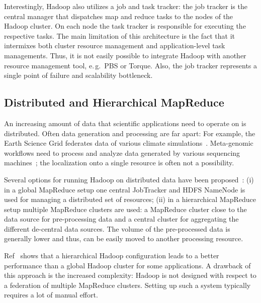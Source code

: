 \documentclass{acm_proc_article-sp}
\newcommand{\jhanote}[1]{ {\textcolor{red} { ***SJ: #1 }}}
\newcommand{\alnote}[1]{ {\textcolor{blue} { ***andreL: #1 }}}
\newcommand{\pnote}[1]{ {\textcolor{magenta} { ***pradeep: #1 }}}
\newcommand{\alnote}[1]{}
\newcommand{\pnote}[1]{}
\newcommand{\jhanote}[1]{}
\newcommand{\upp}{\vspace*{-0.5em}}
\begin{document}
Interestingly, Hadoop also utilizes a job and task tracker: the job
tracker is the central manager that dispatches map and reduce tasks to
the nodes of the Hadoop cluster. On each node the task tracker is
responsible for executing the respective tasks. The main limitation of
this architecture is the fact that it intermixes both cluster resource
management and application-level task managements. Thus, it is not
easily possible to integrate Hadoop with another resource management
tool, e.\,g.\ PBS or Torque. Also, the job tracker represents a single
point of failure and scalability bottleneck.


\upp
\subsection{Distributed and Hierarchical MapReduce}
\label{sec:pmr-distributed}%

An increasing amount of data that scientific applications need to
operate on is distributed. Often data generation
and processing are far apart: For example, the Earth Science Grid
federates data of various climate simulations~\cite{ESG}. Meta-genomic
workflows need to process and analyze data generated by various
sequencing machines~\cite{Jha:2011fk}; the localization onto a single
resource is often not a possibility.

Several options for running Hadoop on distributed data have been
proposed~\cite{weissman-mr-11}: (i) in a global MapReduce setup one
central JobTracker and HDFS NameNode is used for managing a
distributed set of resources; (ii) in a hierarchical MapReduce setup
multiple MapReduce clusters are used: a MapReduce cluster close to the
data source for pre-processing data and a central cluster for
aggregating the different de-central data sources. The volume of the
pre-processed data is generally lower and thus, can be easily moved to
another processing resource. 

Ref~\cite{weissman-mr-11} shows that a hierarchical Hadoop
configuration leads to a better performance than a global Hadoop
cluster for some applications. A drawback of this approach is the
increased complexity: Hadoop is not designed with respect to a
federation of multiple MapReduce clusters. Setting up such a system
typically requires a lot of manual effort.


  

\end{document}
